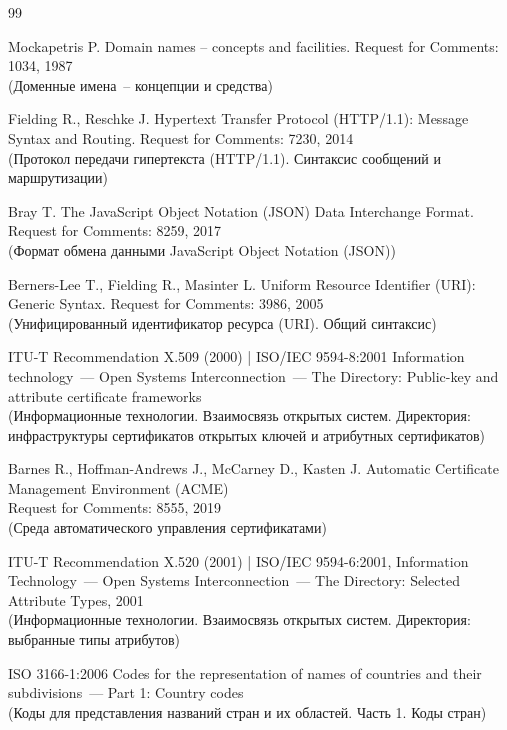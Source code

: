 \clearpage
\begin{thebibliography}{99}

Mockapetris P. 
Domain names -- concepts and facilities. 
Request for Comments: 1034, 1987\\ 
{\small (Доменные имена~-- концепции и средства)} 

Fielding R., Reschke J.
Hypertext Transfer Protocol (HTTP/1.1): Message Syntax and Routing. 
Request for Comments: 7230, 2014\\ 
{\small (Протокол передачи гипертекста (HTTP/1.1). Синтаксис сообщений и 
маршрутизации)}

Bray T.
The JavaScript Object Notation (JSON) Data Interchange Format. 
Request for Comments: 8259, 2017\\ 
{\small (Формат обмена данными JavaScript Object Notation (JSON))} 

Berners-Lee T., Fielding R., Masinter L. 
Uniform Resource Identifier (URI): Generic Syntax.  
Request for Comments: 3986, 2005\\
{\small (Унифицированный идентификатор ресурса (URI). Общий синтаксис)}

ITU-T Recommendation X.509 (2000) | ISO/IEC 9594-8:2001
Information technology~--- Open Systems Interconnection~--- 
The Directory: Public-key and attribute certificate frameworks\\
{\small (Информационные технологии. Взаимосвязь открытых систем.
Директория: инфраструктуры сертификатов открытых ключей и атрибутных 
сертификатов)} 

Barnes R., Hoffman-Andrews J., McCarney D., Kasten J.
Automatic Certificate Management Environment (ACME)\\
Request for Comments: 8555, 2019\\   
{\small (Среда автоматического управления сертификатами)} 

ITU-T Recommendation X.520 (2001) | ISO/IEC 9594-6:2001,
Information Technology~--- Open Systems Interconnection~---
The Directory: Selected Attribute Types, 2001\\
{\small (Информационные технологии. Взаимосвязь открытых систем.
Директория: выбранные типы атрибутов)}

ISO 3166-1:2006 Codes for the representation of names of countries and 
their subdivisions~--- Part 1: Country codes\\
{\small (Коды для представления названий стран и их областей. Часть 1. 
Коды стран)} 


\end{thebibliography}
